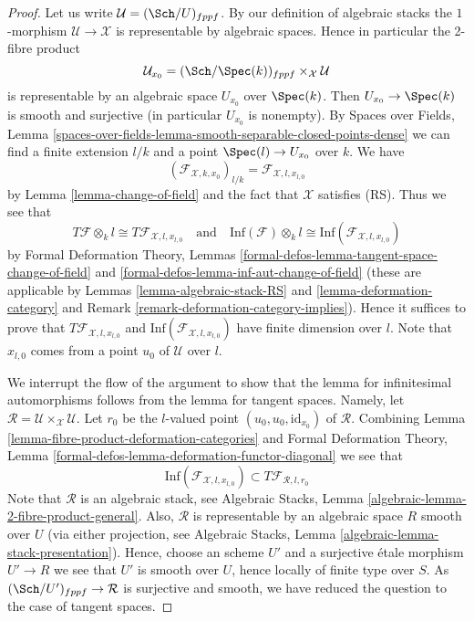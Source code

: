 \begin{proof}
Let us write $\mathcal{U} = (\Sch/U)_{fppf}$. By our definition
of algebraic stacks the $1$-morphism $\mathcal{U} \to \mathcal{X}$
is representable by algebraic spaces. Hence in particular the
2-fibre product
$$
\mathcal{U}_{x_0} = (\Sch/\Spec(k))_{fppf} \times_\mathcal{X} \mathcal{U}
$$
is representable by an algebraic space $U_{x_0}$ over $\Spec(k)$. Then
$U_{x_0} \to \Spec(k)$ is smooth and surjective (in particular $U_{x_0}$
is nonempty). By Spaces over Fields, Lemma
\ref{spaces-over-fields-lemma-smooth-separable-closed-points-dense}
we can find a finite extension $l/k$ and a point
$\Spec(l) \to U_{x_0}$ over $k$. We have
$$
(\mathcal{F}_{\mathcal{X}, k , x_0})_{l/k} =
\mathcal{F}_{\mathcal{X}, l, x_{l, 0}}
$$
by Lemma \ref{lemma-change-of-field} and the fact that $\mathcal{X}$
satisfies (RS). Thus we see that
$$
T\mathcal{F} \otimes_k l \cong T\mathcal{F}_{\mathcal{X}, l, x_{l, 0}}
\quad\text{and}\quad
\text{Inf}(\mathcal{F}) \otimes_k l \cong
\text{Inf}(\mathcal{F}_{\mathcal{X}, l, x_{l, 0}})
$$
by
Formal Deformation Theory, Lemmas
\ref{formal-defos-lemma-tangent-space-change-of-field} and
\ref{formal-defos-lemma-inf-aut-change-of-field}
(these are applicable by
Lemmas \ref{lemma-algebraic-stack-RS} and
\ref{lemma-deformation-category} and
Remark \ref{remark-deformation-category-implies}).
Hence it suffices to prove that $T\mathcal{F}_{\mathcal{X}, l, x_{l, 0}}$
and $\text{Inf}(\mathcal{F}_{\mathcal{X}, l, x_{l, 0}})$
have finite dimension over $l$. Note that $x_{l, 0}$ comes from a point
$u_0$ of $\mathcal{U}$ over $l$.

\medskip\noindent
We interrupt the flow of the argument to show that the lemma for
infinitesimal automorphisms follows from the lemma for tangent spaces.
Namely, let
$\mathcal{R} = \mathcal{U} \times_\mathcal{X} \mathcal{U}$.
Let $r_0$ be the $l$-valued point $(u_0, u_0, \text{id}_{x_0})$ of
$\mathcal{R}$. Combining
Lemma \ref{lemma-fibre-product-deformation-categories} and
Formal Deformation Theory, Lemma
\ref{formal-defos-lemma-deformation-functor-diagonal}
we see that
$$
\text{Inf}(\mathcal{F}_{\mathcal{X}, l, x_{l, 0}})
\subset
T\mathcal{F}_{\mathcal{R}, l, r_0}
$$
Note that $\mathcal{R}$ is an algebraic stack, see
Algebraic Stacks, Lemma \ref{algebraic-lemma-2-fibre-product-general}.
Also, $\mathcal{R}$ is representable by an algebraic space $R$
smooth over $U$ (via either projection, see
Algebraic Stacks, Lemma \ref{algebraic-lemma-stack-presentation}).
Hence, choose an scheme $U'$ and a surjective \'etale morphism
$U' \to R$ we see that $U'$ is smooth over $U$, hence locally of
finite type over $S$. As $(\Sch/U')_{fppf} \to \mathcal{R}$ is
surjective and smooth, we have reduced the question to the case
of tangent spaces.


\end{proof}
